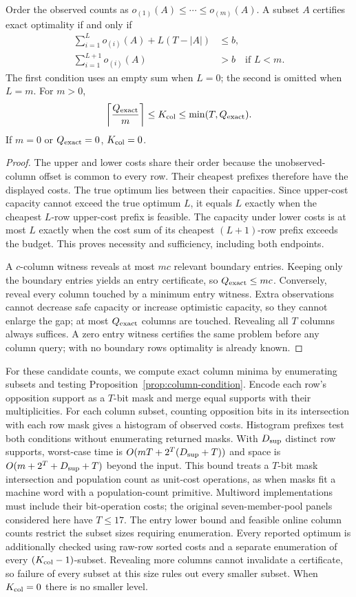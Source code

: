 \begin{proposition}
\label{prop:column-condition}
Order the observed counts as $o_{(1)}(A)\le\cdots\le o_{(m)}(A)$. A subset $A$ certifies exact optimality if and only if
\begin{align*}
 \sum_{i=1}^{L}o_{(i)}(A)+L(T-|A|)&\le b,\\
 \sum_{i=1}^{L+1}o_{(i)}(A)&>b\quad\text{if }L<m.
\end{align*}
The first condition uses an empty sum when $L=0$; the second is omitted when $L=m$. For $m>0$,
\[
 \left\lceil\frac{Q_{\rm exact}}m\right\rceil
 \le K_{\rm col}\le\min(T,Q_{\rm exact}).
\]
If $m=0$ or $Q_{\rm exact}=0$, $K_{\rm col}=0$.
\end{proposition}
\begin{proof}
The upper and lower costs share their order because the unobserved-column offset is common to every row. Their cheapest prefixes therefore have the displayed costs. The true optimum lies between their capacities. Since upper-cost capacity cannot exceed the true optimum $L$, it equals $L$ exactly when the cheapest $L$-row upper-cost prefix is feasible. The capacity under lower costs is at most $L$ exactly when the cost sum of its cheapest $(L+1)$-row prefix exceeds the budget. This proves necessity and sufficiency, including both endpoints.

A $c$-column witness reveals at most $mc$ relevant boundary entries. Keeping only the boundary entries yields an entry certificate, so $Q_{\rm exact}\le mc$. Conversely, reveal every column touched by a minimum entry witness. Extra observations cannot decrease safe capacity or increase optimistic capacity, so they cannot enlarge the gap; at most $Q_{\rm exact}$ columns are touched. Revealing all $T$ columns always suffices. A zero entry witness certifies the same problem before any column query; with no boundary rows optimality is already known.
\end{proof}

For these candidate counts, we compute exact column minima by enumerating subsets and testing Proposition~\ref{prop:column-condition}. Encode each row's opposition support as a $T$-bit mask and merge equal supports with their multiplicities. For each column subset, counting opposition bits in its intersection with each row mask gives a histogram of observed costs. Histogram prefixes test both conditions without enumerating returned masks. With $D_{\rm sup}$ distinct row supports, worst-case time is $O(mT+2^T(D_{\rm sup}+T))$ and space is $O(m+2^T+D_{\rm sup}+T)$ beyond the input. This bound treats a $T$-bit mask intersection and population count as unit-cost operations, as when masks fit a machine word with a population-count primitive. Multiword implementations must include their bit-operation costs; the original seven-member-pool panels considered here have $T\le17$. The entry lower bound and feasible online column counts restrict the subset sizes requiring enumeration. Every reported optimum is additionally checked using raw-row sorted costs and a separate enumeration of every $(K_{\rm col}-1)$-subset. Revealing more columns cannot invalidate a certificate, so failure of every subset at this size rules out every smaller subset. When $K_{\rm col}=0$ there is no smaller level.


